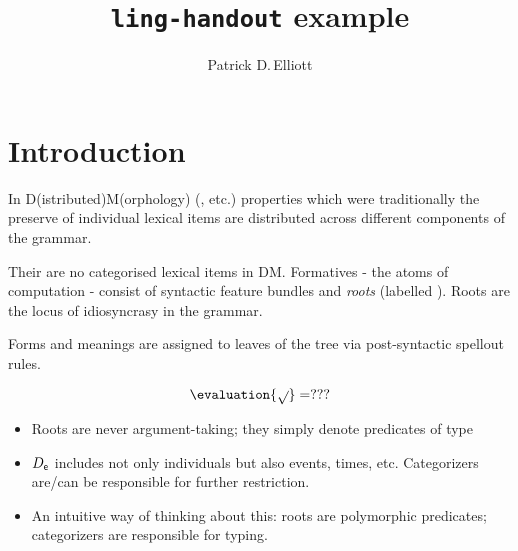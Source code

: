 \documentclass[cronos,landscape,paper=a4]{ling-handout}
\title{\texttt{ling-handout} example}
\author{Patrick D.\,Elliott}
\begin{document}
\maketitle

\section{Introduction}

  In D(istributed)M(orphology) (\citealt{halle1993,halle2000}, etc.) properties
  which were traditionally the preserve of individual lexical items are
  distributed across different components of the grammar.

  Their are no categorised lexical items in DM. Formatives - the atoms of
  computation - consist of syntactic feature bundles and \emph{roots} (labelled
  \dmroot{}). Roots are the locus of idiosyncrasy in the grammar.
  \begin{center}
\end{center}
%
    Forms and meanings are assigned to leaves of the tree via post-syntactic
    spellout rules.



    \[
      \evaluation{\dmroot{}} = ???
    \]


    \begin{itemize}

      \item Roots are never argument-taking; they simply denote predicates of type 

      \item $D_{\mathsf{e}}$ includes not only individuals but also events,
        times, etc. Categorizers are/can be responsible for further restriction.

      \item An intuitive way of thinking about this: roots are polymorphic
        predicates; categorizers are responsible for typing.

    \end{itemize}
\end{document}
